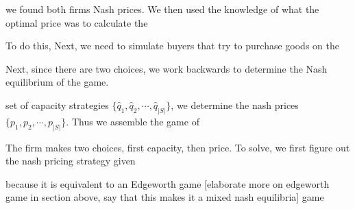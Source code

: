 \documentclass[11pt]{article}
\begin{document}
we found both firms Nash prices. We then used the knowledge of what the optimal
price was to calculate the 

To do this, 
Next, we need to simulate buyers that try to
purchase goods on the 

Next, since there are two choices, we work backwards to determine the Nash
equilibrium of the game. 

set of capacity strategies $\{\hat q_1, \hat q_2, \cdots, \hat q_{|S|}\}$, we
determine the nash prices $\{p_1, p_2, \cdots, p_{|S|}\}$.  Thus we assemble
the game of 

The firm makes two choices, first capacity, then price. To solve, we first
figure out the nash pricing strategy given 

because it is equivalent
to an Edgeworth game
[elaborate more on edgeworth game in section above, say that this makes it a
mixed nash equilibria] game
\end{document}
